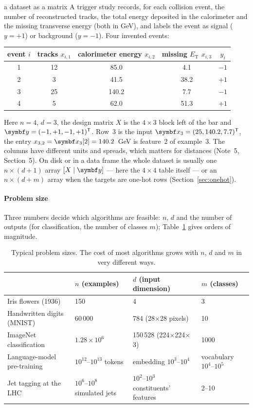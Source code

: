 \documentclass[11pt]{article}
\begin{document}
\begin{worked}{a dataset as a matrix}
A trigger study records, for each collision event, the number of reconstructed tracks, the total energy deposited in
the calorimeter and the missing transverse energy (both in GeV), and labels the event as signal ($y = +1$) or
background ($y = -1$). Four invented events:
\begin{center}\small
\begin{tabular}{@{}cccc|c@{}}\toprule
event $i$ & tracks $x_{i,1}$ & calorimeter energy $x_{i,2}$ & missing $E_{\mathrm T}$ $x_{i,3}$ & $y_i$ \\ \midrule
1 & 12 & 85.0 & 4.1 & $-1$ \\
2 & 3 & 41.5 & 38.2 & $+1$ \\
3 & 25 & 140.2 & 7.7 & $-1$ \\
4 & 5 & 62.0 & 51.3 & $+1$ \\ \bottomrule
\end{tabular}
\end{center}
Here $n = 4$, $d = 3$, the design matrix $X$ is the $4 \times 3$ block left of the bar and $\vect{y} = (-1, +1, -1,
+1)\T$. Row~3 is the input $\x_3 = (25, 140.2, 7.7)\T$, the entry $x_{3,2} = \x_3[2] = 140.2$~GeV is feature~2 of
example~3. The columns have different units and spreads, which matters for distances (Note~5, Section~5). On disk
or in a data frame the whole dataset is usually one $n \times (d+1)$ array $[X \mid \vect{y}]$ --- here the $4 \times
4$ table itself --- or an $n \times (d+m)$ array when the targets are one-hot rows (Section~\ref{sec:onehot}).
\end{worked}

\paragraph{Problem size} Three numbers decide which algorithms are feasible: $n$, $d$ and the number of outputs (for
classification, the number of classes $m$); Table~\ref{tab:size} gives orders of magnitude.

\begin{table}[h]\centering\small\setlength{\tabcolsep}{5pt}
\caption{Typical problem sizes. The cost of most algorithms grows with $n$, $d$ and $m$ in very different ways.}
\label{tab:size}
\begin{tabular}{@{}llll@{}}\toprule
 & $n$ (examples) & $d$ (input dimension) & $m$ (classes) \\ \midrule
Iris flowers (1936) & 150 & 4 & 3 \\
Handwritten digits (MNIST) & 60\,000 & 784 (28$\times$28 pixels) & 10 \\
ImageNet classification & $1.28 \times 10^6$ & 150\,528 (224$\times$224$\times$3) & 1000 \\
Language-model pre-training & $10^{12}$--$10^{13}$ tokens & embedding $10^3$--$10^4$ & vocabulary $10^4$--$10^5$ \\
Jet tagging at the LHC & $10^6$--$10^8$ simulated jets & $10^2$--$10^3$ constituents' features & 2--10 \\ \bottomrule
\end{tabular}
\end{table}
\end{document}
